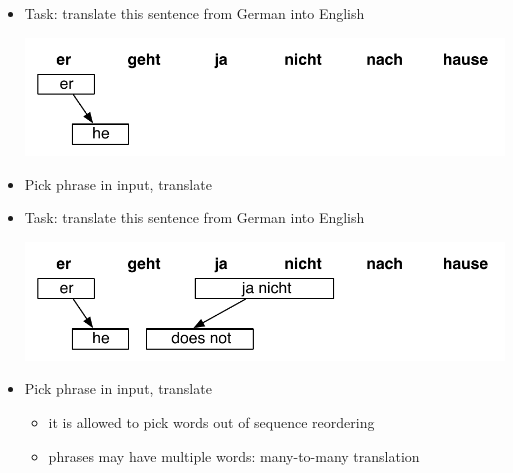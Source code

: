 \documentclass[landscape]{slides}
\begin{document}

\begin{itemize} \vspace{10mm}
\item Task: translate this sentence from German into English
\begin{center}
\includegraphics[scale=1.5]{translation-step2.pdf}
\end{center}
\item Pick phrase in input, translate
\end{itemize}



\begin{itemize}\vspace{10mm}
\item Task: translate this sentence from German into English
\begin{center}
\includegraphics[scale=1.5]{translation-step3.pdf}
\end{center}
\item Pick phrase in input, translate
\begin{itemize}
\item it is allowed to pick words out of sequence reordering
\item phrases may have multiple words: many-to-many translation
\end{itemize}
\end{itemize}

\end{document}

